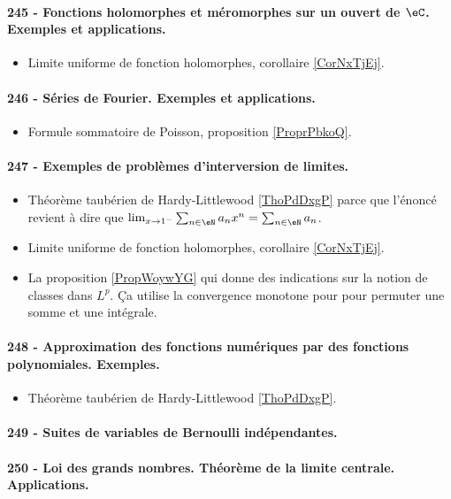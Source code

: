\paragraph{245 - Fonctions holomorphes et méromorphes sur un ouvert de \( \eC\). Exemples et applications.}
\begin{itemize}
    \item Limite uniforme de fonction holomorphes, corollaire \ref{CorNxTjEj}.
\end{itemize}
\paragraph{246 - Séries de Fourier. Exemples et applications.}
\begin{itemize}
    \item Formule sommatoire de Poisson, proposition \ref{ProprPbkoQ}.
\end{itemize}
\paragraph{247 - Exemples de problèmes d’interversion de limites.}
\begin{itemize}
    \item Théorème taubérien de Hardy-Littlewood \ref{ThoPdDxgP} parce que l'énoncé revient à dire que \( \lim_{x\to 1^-} \sum_{n\in \eN}a_nx^n=\sum_{n\in \eN}a_n\).
    \item Limite uniforme de fonction holomorphes, corollaire \ref{CorNxTjEj}.
    \item La proposition \ref{PropWoywYG} qui donne des indications sur la notion de classes dans \( L^p\). Ça utilise la convergence monotone pour  pour permuter une somme et une intégrale.
\end{itemize}
\paragraph{248 - Approximation des fonctions numériques par des fonctions polynomiales. Exemples.}
\begin{itemize}
    \item Théorème taubérien de Hardy-Littlewood \ref{ThoPdDxgP}.
\end{itemize}
\paragraph{249 - Suites de variables de Bernoulli indépendantes.}
\paragraph{250 - Loi des grands nombres. Théorème de la limite centrale. Applications.}

